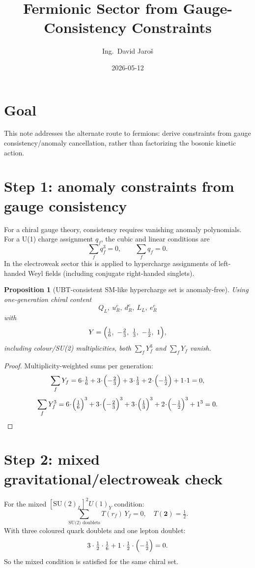 \documentclass[12pt,a4paper]{article}
\title{Fermionic Sector from Gauge-Consistency Constraints}
\author{Ing.\ David Jaroš}
\date{2026-05-12}
\newtheorem{proposition}{Proposition}[section]
\begin{document}
\maketitle

\section{Goal}
This note addresses the alternate route to fermions:
derive constraints from gauge consistency/anomaly cancellation, rather than
factorizing the bosonic kinetic action.

\section{Step 1: anomaly constraints from gauge consistency}
For a chiral gauge theory, consistency requires vanishing anomaly polynomials.
For a U(1) charge assignment \(q_f\), the cubic and linear conditions are
\[
\sum_f q_f^3=0,\qquad \sum_f q_f=0.
\]
In the electroweak sector this is applied to hypercharge assignments of
left-handed Weyl fields (including conjugate right-handed singlets).

\begin{proposition}[UBT-consistent SM-like hypercharge set is anomaly-free]
Using one-generation chiral content
\[
Q_L,\ u_R^c,\ d_R^c,\ L_L,\ e_R^c
\]
with
\[
Y=\Bigl(\tfrac16,\ -\tfrac23,\ \tfrac13,\ -\tfrac12,\ 1\Bigr),
\]
including colour/SU(2) multiplicities, both
\(
\sum_f Y_f^3
\)
and
\(
\sum_f Y_f
\)
vanish.
\end{proposition}

\begin{proof}
Multiplicity-weighted sums per generation:
\[
\sum_f Y_f
=6\!\cdot\!\tfrac16 + 3\!\cdot\!\Bigl(-\tfrac23\Bigr) + 3\!\cdot\!\tfrac13
+2\!\cdot\!\Bigl(-\tfrac12\Bigr) + 1\!\cdot\!1 = 0,
\]
\[
\sum_f Y_f^3
=6\!\cdot\!\Bigl(\tfrac16\Bigr)^3
+3\!\cdot\!\Bigl(-\tfrac23\Bigr)^3
+3\!\cdot\!\Bigl(\tfrac13\Bigr)^3
+2\!\cdot\!\Bigl(-\tfrac12\Bigr)^3
+1^3 = 0.
\]
\end{proof}

\section{Step 2: mixed gravitational/electroweak check}
For the mixed \([\mathrm{SU}(2)_L]^2U(1)_Y\) condition:
\[
\sum_{\text{SU(2) doublets}} T(r_f)\,Y_f = 0,
\quad T(\mathbf{2})=\tfrac12.
\]
With three coloured quark doublets and one lepton doublet:
\[
3\cdot \tfrac12\cdot \tfrac16 + 1\cdot \tfrac12\cdot\Bigl(-\tfrac12\Bigr)=0.
\]
So the mixed condition is satisfied for the same chiral set.
\end{document}
